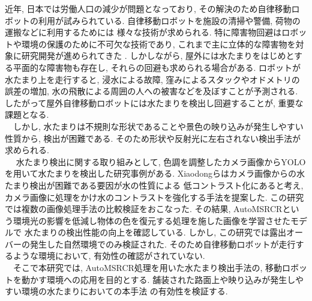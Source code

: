 \documentclass[10pt]{jarticle}
\begin{document}
    近年, 日本では労働人口の減少が問題となっており, 
    その解決のため自律移動ロボットの利用が試みられている. 
    自律移動ロボットを施設の清掃や警備, 荷物の運搬などに利用するためには
    様々な技術が求められる. 
    特に障害物回避はロボットや環境の保護のために不可欠な技術であり, 
    これまで主に立体的な障害物を対象に研究開発が進められてきた\cite{朝田2019} . 
    しかしながら, 屋外には水たまりをはじめとする平面的な障害物も存在し, 
    それらの回避も求められる場合がある. ロボットが水たまり上を走行すると, 
    浸水による故障, 窪みによるスタックやオドメトリの誤差の増加, 
    水の飛散による周囲の人への被害などを及ぼすことが予測される. 
    したがって屋外自律移動ロボットには水たまりを検出し回避することが, 
    重要な課題となる.\\ 
    　しかし, 水たまりは不規則な形状であることや景色の映り込みが発生しやすい性質から, 
    検出が困難である. そのため形状や反射光に左右されない検出手法が求められる.\\
    　 水たまり検出に関する取り組みとして, 
    色調を調整したカメラ画像からYOLOを用いて水たまりを検出した研究事例がある. 
    Xiaodongら\cite{Xiaodong2022}はカメラ画像からの水たまり検出が困難である要因が水の性質による
    低コントラスト化にあると考え, カメラ画像に処理をかけ水のコントラストを強化する手法を提案した. 
    この研究では複数の画像処理手法の比較検証をおこなった. 
    その結果, AutoMSRCRという環境光の影響を低減し物体の色を復元する処理を施した画像を学習させたモデルで
    水たまりの検出性能の向上を確認している. 
    しかし, この研究では露出オーバーの発生した自然環境でのみ検証された.  
    そのため自律移動ロボットが走行するような環境において, 有効性の確認がされていない.   \\
    　そこで本研究では, AutoMSRCR処理を用いた水たまり検出手法の, 移動ロボットを動かす環境への応用を目的とする. 
    舗装された路面上や映り込みが発生しやすい環境の水たまりにおいての本手法
    の有効性を検証する.
\end{document}

